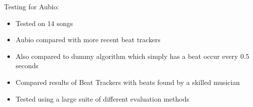 \documentclass{beamer}
\begin{document}
	\begin{frame}
		Testing for Aubio:
		\begin{itemize}
			\item Tested on 14 songs
			\item Aubio compared with more recent beat trackers
			\item Also compared to dummy algorithm which simply has a beat occur every 0.5 seconds
			\item Compared results of Beat Trackers with beats found by a skilled musician
			\item Tested using a large suite of different evaluation methods
			
		\end{itemize}		
	\end{frame}
\end{document}
